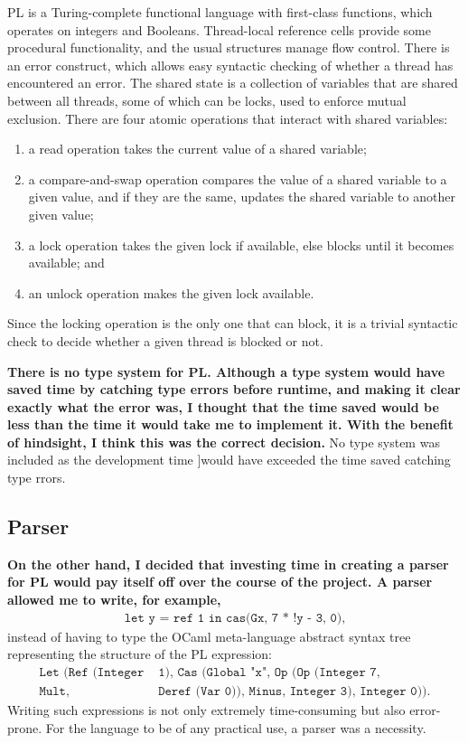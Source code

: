 \documentclass[12pt,a4paper,twoside,openright]{report}
\begin{document}
PL is a Turing-complete functional
language with first-class
functions, which operates on integers and
Booleans.
Thread-local reference cells provide some
procedural functionality, and the usual
structures manage flow control. There is
an error construct, which allows easy syntactic
checking of whether a thread has encountered
an error. The shared
state is a collection of variables that are
shared between all threads, some of which
can be locks, used to enforce mutual exclusion.
There are four atomic operations
that interact with shared variables:
\begin{enumerate}
	\item a read operation takes the current value
	of a shared variable;
	\item a compare-and-swap operation
	compares the value of a shared variable to a
	given value, and if they are the same, updates
	the shared variable to another given value;
	\item a lock operation takes the given lock if
	available, else blocks until it becomes available; and
	\item an unlock operation makes the given lock
	available.
\end{enumerate}
Since the locking operation is the only
one that can block, it is a trivial syntactic
check to decide whether a given thread is
blocked or not.

\textbf{There is no type system for PL. Although a type system
would have saved time by catching type errors before
runtime, and making it clear exactly what the error was,
I thought that the time saved would be less than the
time it would take me to implement it.
With the benefit of hindsight, I think this was the
correct decision.}
No type system was included as the development time 
]would have exceeded the time saved catching type rrors.

\subsection{Parser}
\textbf{On the other hand, I decided that investing time in creating a
parser for PL would pay itself off over the course of the project.
A parser allowed me to write, for example,}
\begin{align*}
	\texttt{let y = ref 1 in cas(Gx, 7 * !y - 3, 0)},
\end{align*}
instead of having to type the OCaml meta-language abstract
syntax tree representing the structure of the PL expression:
\begin{align*}
	\texttt{Let (Ref (Integer}& \texttt{ 1), Cas (Global "x",
		Op (Op (Integer 7,} \\ \texttt{Mult,}& \texttt{ Deref (Var 0)), Minus, Integer 3),
		Integer 0))}.
\end{align*}
Writing such expressions is not only extremely time-consuming but
also error-prone. For the language to be of any practical use,
a parser was a necessity.
\end{document}
